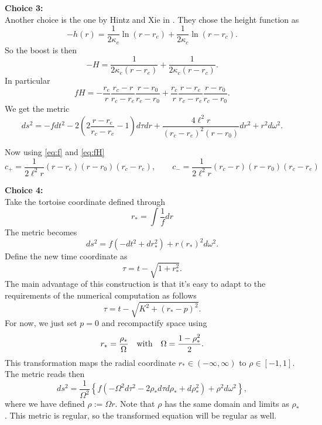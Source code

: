 \documentclass[a4paper]{article}
\begin{document}
{\bf Choice 3:}\\
Another choice is the one by Hintz and Xie in \cite{hintz:2021}. They chose the height function as
\[ -h(r) = \frac{1}{2\kappa_e} \ln(r-r_e) + \frac{1}{2\kappa_c} \ln(r-r_c). \]
So the boost is then
\[ -H = \frac{1}{2\kappa_e (r-r_e)}+ \frac{1}{2\kappa_c (r-r_c)}.\]
In particular
\[ fH = - \frac{r_e}{r} \frac{r_c-r}{r_c-r_e} \frac{r-r_0}{r_e-r_0} +  \frac{r_c}{r} \frac{r-r_e}{r_c-r_e} \frac{r-r_0}{r_c-r_0}. \]
We get the metric
\[ ds^2 = - f dt^2 - 2 \left(2 \frac{r-r_e}{r_c-r_e} - 1\right) d\tau dr + \frac{4 \ell^2 r}{(r_c-r_e)^2 (r-r_0)} dr^2 + r^2 d\omega^2. \]

Now using \eqref{eq:f} and \eqref{eq:fH}
\[ c_{+} = \frac{1}{2\ell^2 r} (r-r_e)(r-r_0)(r_c-r_e), \qquad  c_{-} = \frac{1}{2\ell^2 r} (r_c-r)(r-r_0)(r_c-r_e) \]

{\bf Choice 4:}\\
Take the tortoise coordinate defined through
\[ r_\ast = \int\frac{1}{f}dr \]
The metric becomes 
\[ ds^2 = f \left( -dt^2 + dr_\ast^2\right) + r(r_\ast)^2 d\omega^2. \]
Define the new time coordinate as 
\[ \tau = t - \sqrt{1+r_\ast^2}. \]
The main advantage of this construction is that it's easy to adapt to the requirements of the numerical computation as follows
\[ \tau = t - \sqrt{K^2+(r_\ast-p)^2}. \]
For now, we just set $p=0$ and recompactify space using
\[ r_\ast  = \frac{\rho_\ast}{\Omega} \quad \rm{with} \quad \Omega = \frac{1-\rho_\ast^2}{2}.\]
This transformation maps the radial coordinate $r_\ast\in(-\infty,\infty)$ to $\rho\in[-1,1]$. The metric reads then
\[  ds^2 =  \frac{1}{\Omega^2} \left\{ f\left(-\Omega^2 d\tau^2 - 2 \rho_\ast d\tau d\rho_\ast +  d\rho_\ast^2\right) + \rho^2 d\omega^2 \right\}, \] 
where we have defined $\rho :=  \Omega r$. Note that $\rho$ has the same domain and limits as $\rho_\ast$. This metric is regular, so the transformed equation will be regular as well.

\end{document}
